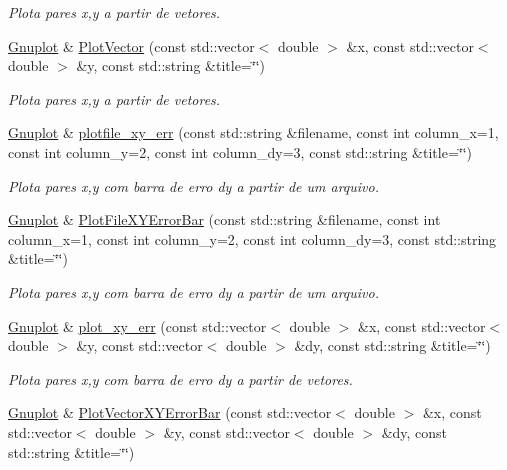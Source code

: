 \begin{DoxyCompactItemize}
\begin{DoxyCompactList}\small\item\em Plota pares x,y a partir de vetores. \end{DoxyCompactList}\item 
\hyperlink{class_gnuplot}{Gnuplot} \& \hyperlink{class_gnuplot_ae282636936128008b2c82f569f607820}{Plot\+Vector} (const std\+::vector$<$ double $>$ \&x, const std\+::vector$<$ double $>$ \&y, const std\+::string \&title=\char`\"{}\char`\"{})
\begin{DoxyCompactList}\small\item\em Plota pares x,y a partir de vetores. \end{DoxyCompactList}\item 
\hyperlink{class_gnuplot}{Gnuplot} \& \hyperlink{class_gnuplot_a33ab4bb031fa6a6b798c90a9089648e9}{plotfile\+\_\+xy\+\_\+err} (const std\+::string \&filename, const int column\+\_\+x=1, const int column\+\_\+y=2, const int column\+\_\+dy=3, const std\+::string \&title=\char`\"{}\char`\"{})
\begin{DoxyCompactList}\small\item\em Plota pares x,y com barra de erro dy a partir de um arquivo. \end{DoxyCompactList}\item 
\hyperlink{class_gnuplot}{Gnuplot} \& \hyperlink{class_gnuplot_a759edbd9404476415a4d6d5a286c360c}{Plot\+File\+X\+Y\+Error\+Bar} (const std\+::string \&filename, const int column\+\_\+x=1, const int column\+\_\+y=2, const int column\+\_\+dy=3, const std\+::string \&title=\char`\"{}\char`\"{})
\begin{DoxyCompactList}\small\item\em Plota pares x,y com barra de erro dy a partir de um arquivo. \end{DoxyCompactList}\item 
\hyperlink{class_gnuplot}{Gnuplot} \& \hyperlink{class_gnuplot_a3dd3934b09094a9ba48035a2edf4d4fd}{plot\+\_\+xy\+\_\+err} (const std\+::vector$<$ double $>$ \&x, const std\+::vector$<$ double $>$ \&y, const std\+::vector$<$ double $>$ \&dy, const std\+::string \&title=\char`\"{}\char`\"{})
\begin{DoxyCompactList}\small\item\em Plota pares x,y com barra de erro dy a partir de vetores. \end{DoxyCompactList}\item 
\hyperlink{class_gnuplot}{Gnuplot} \& \hyperlink{class_gnuplot_a6d3863c1b14d93c14b50df0a11dfdbd8}{Plot\+Vector\+X\+Y\+Error\+Bar} (const std\+::vector$<$ double $>$ \&x, const std\+::vector$<$ double $>$ \&y, const std\+::vector$<$ double $>$ \&dy, const std\+::string \&title=\char`\"{}\char`\"{})

\end{DoxyCompactItemize}
